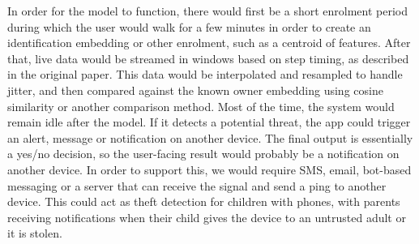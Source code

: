 In order for the model to function, there would first be a short enrolment period during which the user would walk for a few minutes in order to create an identification embedding or other enrolment, such as a centroid of features. After that, live data would be streamed in windows based on step timing, as described in the original paper. This data would be interpolated and resampled to handle jitter, and then compared against the known owner embedding using cosine similarity or another comparison method. Most of the time, the system would remain idle after the model. If it detects a potential threat, the app could trigger an alert, message or notification on another device. The final output is essentially a yes/no decision, so the user-facing result would probably be a notification on another device. In order to support this, we would require SMS, email, bot-based messaging or a server that can receive the signal and send a ping to another device. This could act as theft detection for children with phones, with parents receiving notifications when their child gives the device to an untrusted adult or it is stolen.